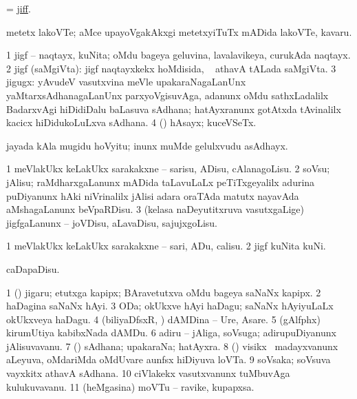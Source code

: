 \bentry
{}
\gl{\nA}
\bmng
 = \hyperlink{jiff}{jiff}. 
\emng
\eentry

\bentry
{}
\gl{\nA}
\expl{\P}
\bmng
metetx lakoVTe; aMce upayoVgakAkxgi metetxyiTuTx mADida lakoVTe, kavaru. 
\emng
\eentry

\bentry
{}
\gl{\nA}
\bmng
\bnum
\num{1} jigf -- naqtayx, kuNita; oMdu bageya geluvina, lavalavikeya, curukAda naqtayx. 
\num{2} jigf (saMgiVta): jigf naqtayxkekx hoMdisida, \sA\  athavA  tALada saMgiVta. 
\num{3} jigugx: yAvudeV vasutxvina meVle upakaraNagaLanUnx yaMtarxsAdhanagaLanUnx parxyoVgisuvAga, adanunx oMdu sathxLadalilx BadarxvAgi hiDidiDalu baLasuva sAdhana; hatAyxranunx gotAtxda tAvinalilx kacicx hiDidukoLuLxva sAdhana. 
\num{4} (\ashi) hAsayx; kuceVSeTx. 
\enum
\emng

\noindent
\gl{\nuga}
\bmng
{} jayada kAla mugidu hoVyitu; inunx muMde gelulxvudu asAdhayx. 
\emng
\eentry

\bentry
{}
\gl{\kirx}
\bmng
\emng

\noindent
\gl{\sakirx}
\bmng
\bnum
\num{1} meVlakUkx keLakUkx sarakakxne -- sarisu, ADisu, cAlanagoLisu. 
\num{2} soVsu; jAlisu; raMdharxgaLanunx mADida taLavuLaLx peTiTxgeyalilx adurina puDiyanunx hAki niVrinalilx jAlisi adara oraTAda matutx nayavAda aMshagaLanunx beVpaRDisu. 
\num{3} (kelasa naDeyutitxruva vasutxgaLige) jigfgaLanunx -- joVDisu, aLavaDisu, sajujxgoLisu. 
\enum
\emng

\noindent
\gl{\akirx}
\bmng
\bnum
\num{1} meVlakUkx keLakUkx sarakakxne -- sari, ADu, calisu. 
\num{2} jigf kuNita kuNi. 
\enum
\emng

\noindent
\gl{\nuga}
\bmng
{} caDapaDisu. 
\emng
\eentry

\bentry
{}
\gl{\nA}
\bmng
\bnum
\num{1} (\nw) jigaru; etutxga kapipx; BAravetutxva oMdu bageya saNaNx kapipx. 
\num{2} haDagina saNaNx hAyi. 
\num{3} ODa; okUkxve hAyi haDagu; saNaNx hAyiyuLaLx okUkxveya haDagu. 
\num{4} (biliyaDfsxR, \ashi) dAMDina -- Ure, Asare. 
\num{5} (gAlfphx) kirumUtiya kabibxNada dAMDu. 
\num{6} adiru -- jAliga, soVsuga; adirupuDiyanunx jAlisuvavanu. 
\num{7} (\ashi) sAdhana; upakaraNa; hatAyxra. 
\num{8} (\ame) visikx \mo\ madayxvanunx aLeyuva, oMdariMda oMdUvare aunfsx hiDiyuva loVTa.   
\num{9} soVsaka; soVsuva vayxkitx athavA sAdhana. 
\num{10} ciVlakekx vasutxvanunx tuMbuvAga kulukuvavanu. 
\num{11} (heMgasina) moVTu -- ravike, kupapxsa. 
\enum
\emng
\eentry

